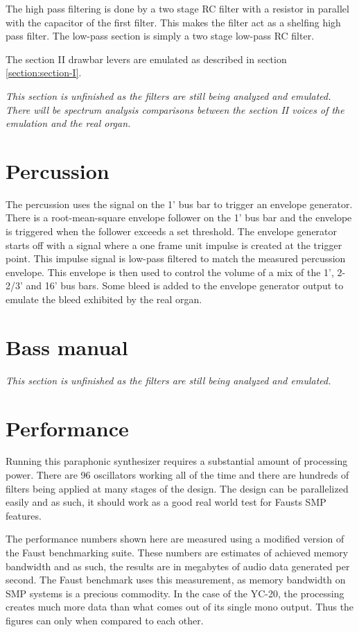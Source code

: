 \documentclass[11pt,a4paper]{article}
\begin{document}
The high pass filtering is done by a two stage RC filter with a resistor in parallel with the capacitor of the first filter. This makes the filter act as a shelfing high pass filter. The low-pass section is simply a two stage low-pass RC filter.

The section II drawbar levers are emulated as described in section \ref{section:section-I}.

\emph{This section is unfinished as the filters are still being analyzed and emulated. There will be spectrum analysis comparisons between the section II voices of the emulation and the real organ.}


\section{Percussion}

The percussion uses the signal on the 1' bus bar to trigger an envelope generator. There is a root-mean-square envelope follower on the 1' bus bar and the envelope is triggered when the follower exceeds a set threshold. The envelope generator starts off with a signal where a one frame unit impulse is created at the trigger point. This impulse signal is low-pass filtered to match the measured percussion envelope. This envelope is then used to control the volume of a mix of the 1', 2-2/3' and 16' bus bars. Some bleed is added to the envelope generator output to emulate the bleed exhibited by the real organ.

\section{Bass manual}

\emph{This section is unfinished as the filters are still being analyzed and emulated.}

\section{Performance}
\label{section:performance}

Running this paraphonic synthesizer requires a substantial amount of processing power. There are 96 oscillators working all of the time and there are hundreds of filters being applied at many stages of the design. The design can be parallelized easily and as such, it should work as a good real world test for Fausts SMP features.

The performance numbers shown here are measured using a modified version of the Faust benchmarking suite. These numbers are estimates of achieved memory bandwidth and as such, the results are in megabytes of audio data generated per second. The Faust benchmark uses this measurement, as memory bandwidth on SMP systems is a precious commodity. In the case of the YC-20, the processing creates much more data than what comes out of its single mono output. Thus the figures can only when compared to each other.
\end{document}
